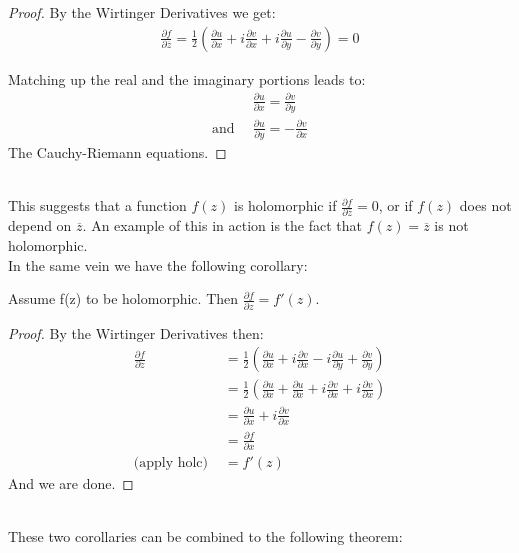 \begin{proof} By the Wirtinger Derivatives we get:
\begin{align*}
\frac{\partial f}{\partial \overline{z}} = \frac{1}{2} \left( \frac{\partial u}{\partial x} + i\frac{\partial v}{\partial x} + i \frac{\partial u}{\partial y} - \frac{\partial v}{\partial y}\right) = 0
\end{align*}

Matching up the real and the imaginary portions leads to:
\begin{align*}
    &\frac{\partial u}{\partial x} = \frac{\partial v}{\partial y}\\
    \text{and } \, & \frac{\partial u}{\partial y} = -\frac{\partial v}{\partial x}
\end{align*}
The Cauchy-Riemann equations.
\end{proof}\\

This suggests that a function $f(z)$ is holomorphic if $\frac{\partial f}{\partial \overline{z}} = 0$, or if $f(z)$ does not depend on $\overline{z}$. An example of this in action is the fact that $f(z)=\overline{z}$ is not holomorphic.\\

In the same vein we have the following corollary:

\begin{corollary}
Assume f(z) to be holomorphic. Then $\frac{\partial f}{\partial z} = f'(z)$.
\end{corollary}

\begin{proof}
By the Wirtinger Derivatives then:
\begin{align*}
\frac{\partial f}{\partial z} &= \frac{1}{2}\left( \frac{\partial u}{\partial x} +i\frac{\partial v}{\partial x} -i\frac{\partial u}{\partial y}+\frac{\partial v}{\partial y}\right)\\
&=\frac{1}{2}\left( \frac{\partial u}{\partial x} + \frac{\partial u}{\partial x} + i\frac{\partial v}{\partial x} + i\frac{\partial v}{\partial x}\right)\\
&= \frac{\partial u}{\partial x} + i\frac{\partial v}{\partial x}\\
&= \frac{\partial f}{\partial x}\\
\text{(apply holc) } &= f'(z)
\end{align*}
And we are done.
\end{proof}\\

These two corollaries can be combined to the following theorem:

